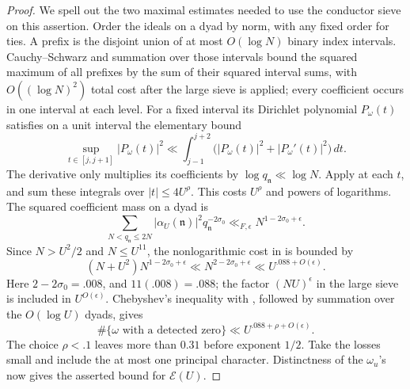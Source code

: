 \begin{proof}
We spell out the two maximal estimates needed to use the conductor
sieve on this assertion.  Order the ideals on a dyad by norm, with any
fixed order for ties.  A prefix is the disjoint union of at most
\(O(\log N)\) binary index intervals.  Cauchy--Schwarz and summation
over those intervals bound the squared maximum of all prefixes by the
sum of their squared interval sums, with \(O((\log N)^2)\) total cost
after the large sieve is applied; every coefficient occurs in one
interval at each level.  For a fixed interval its Dirichlet polynomial
\(P_\omega(t)\) satisfies on a unit interval the elementary bound
\[
 \sup_{t\in[j,j+1]}|P_\omega(t)|^2
 \ll\int_{j-1}^{j+2}
        \bigl(|P_\omega(t)|^2+|P_\omega'(t)|^2\bigr)\,dt.
\]
The derivative only multiplies its coefficients by
\(\log q_{\mathfrak n}\ll\log N\).  Apply
 at each \(t\), and sum these integrals over
\(|t|\le4U^\rho\).  This costs \(U^\rho\) and powers of logarithms.
The squared coefficient mass on a dyad is
\[
 \sum_{N<q_{\mathfrak n}\le2N}
       |\alpha_U(\mathfrak n)|^2q_{\mathfrak n}^{-2\sigma_0}
       \ll_{F,\epsilon}N^{1-2\sigma_0+\epsilon}.
\]
Since \(N>U^2/2\) and \(N\le U^{11}\), the nonlogarithmic cost in
 is bounded by
\begin{equation}
 (N+U^2)N^{1-2\sigma_0+\epsilon}
       \ll N^{2-2\sigma_0+\epsilon}
       \ll U^{.088+O(\epsilon)} .
\label{eq:density-exponent}
\end{equation}
Here \(2-2\sigma_0=.008\), and \(11(.008)=.088\); the factor
\((NU)^\epsilon\) in the large sieve is included in \(U^{O(\epsilon)}\).
Chebyshev's inequality with , followed by
summation over the \(O(\log U)\) dyads, gives
\[
 \#\{\omega\text{ with a detected zero}\}
       \ll U^{.088+\rho+O(\epsilon)}.
\]
The choice \(\rho<.1\) leaves more than \(0.31\) before exponent \(1/2\).
Take the losses small and include the at most one principal character.
Distinctness of the \(\omega_u\)'s now gives the asserted bound for
\(\mathcal E(U)\).


\end{proof}
